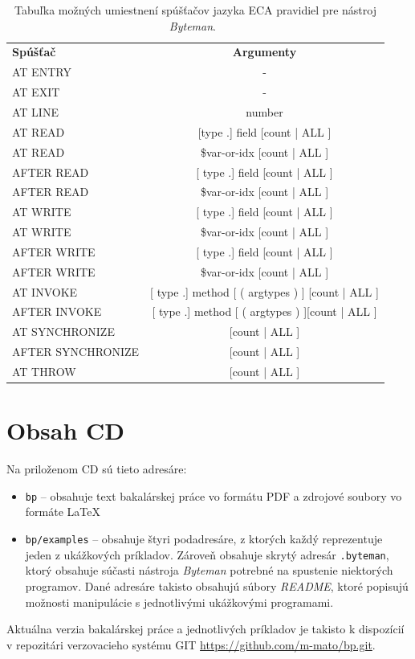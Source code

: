 \documentclass[11pt,final,oneside]{fithesis}
\begin{document}
\begin{table}
  \begin{tabular}{| l | c |}
    \hline
    \textbf{Spúšťač} & \textbf{Argumenty} \\
    \hhline{|=|=|}
    AT ENTRY & - \\ \hline
    AT EXIT & - \\ \hline
    AT LINE & number \\ \hline
    AT READ & [type .] field [count | ALL ] \\ \hline
    AT READ & \$var-or-idx [count | ALL ] \\ \hline
    AFTER READ & [ type .] field [count | ALL ] \\ \hline
    AFTER READ & \$var-or-idx [count | ALL ] \\ \hline
    AT WRITE & [ type .] field [count | ALL ] \\ \hline
    AT WRITE & \$var-or-idx [count | ALL ] \\ \hline
    AFTER WRITE & [ type .] field [count | ALL ] \\ \hline
    AFTER WRITE & \$var-or-idx [count | ALL ] \\ \hline
    AT INVOKE & [ type .] method [ ( argtypes ) ] [count | ALL ] \\ \hline
    AFTER INVOKE & [ type .] method [ ( argtypes ) ][count | ALL ] \\ \hline
    AT SYNCHRONIZE & [count | ALL ] \\ \hline
    AFTER SYNCHRONIZE & [count | ALL ] \\ \hline
    AT THROW & [count | ALL ] \\
    \hline
  \end{tabular}
  \caption{Tabuľka možných umiestnení spúšťačov jazyka ECA pravidiel pre
  nástroj \textit{Byteman}.~\cite{RedHat:Byteman}}
  \label{tab:tab6}
\end{table}

\chapter{Obsah CD}
Na priloženom CD sú tieto adresáre:

\begin{itemize}
\item \texttt{bp} -- obsahuje text bakalárskej práce vo formátu PDF a zdrojové
soubory vo formáte \LaTeX
\item \texttt{bp/examples} -- obsahuje štyri podadresáre, z ktorých každý 
reprezentuje jeden z ukážkových príkladov. Zároveň obsahuje skrytý adresár
\texttt{.byteman}, ktorý obsahuje súčasti nástroja \textit{Byteman} potrebné
na spustenie niektorých programov. Dané adresáre takisto obsahujú
súbory \textit{README}, ktoré popisujú možnosti manipulácie s jednotlivými
ukážkovými programami.
\end{itemize}

Aktuálna verzia bakalárskej práce a jednotlivých príkladov je takisto k
dispozícií v repozitári verzovacieho systému GIT
\url{https://github.com/m-mato/bp.git}.
\end{document}
